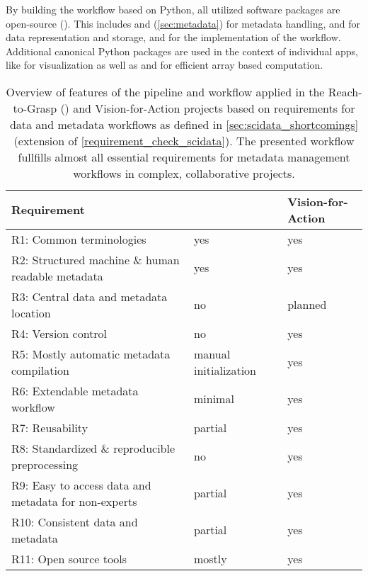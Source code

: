 By building the workflow based on Python, all utilized software packages are open-source (). This includes  and  (\cref{sec:metadata}) for metadata handling,  and  for data representation and storage, and  for the implementation of the workflow. Additional  canonical Python packages are used in the context of individual apps, like  for visualization as well as  and  for efficient array based computation.

\begin{table}[]
\footnotesize
\begin{tabular}{|l|l|l|}
\hline
Requirement                                          &  \cite{Brochier_2018} & Vision-for-Action \\  \hline
R1: Common terminologies                             &  yes & yes \\ \hline
R2: Structured machine \& human readable metadata    &  yes & yes \\ \hline
R3: Central data and metadata location               &  no & planned \\ \hline
R4: Version control                                  &  no & yes \\ \hline
R5: Mostly automatic metadata compilation            &  manual initialization & yes \\ \hline
R6: Extendable metadata workflow                     &  minimal & yes \\ \hline
R7: Reusability                                      &  partial & yes \\ \hline
R8: Standardized \& reproducible preprocessing       &  no & yes \\ \hline
R9: Easy to access data and metadata for non-experts &  partial & yes \\ \hline
R10: Consistent data and metadata                    &  partial & yes \\ \hline
R11: Open source tools                               &  mostly & yes \\ \hline
\end{tabular}
\caption[Overview of workflow features for Vision-for-Action project]{Overview of features of the pipeline and workflow applied in the Reach-to-Grasp (\cite{Brochier_2018}) and Vision-for-Action projects based on requirements for data and metadata workflows as defined in \cref{sec:scidata_shortcomings} (extension of \cref{requirement_check_scidata}). The presented workflow fullfills almost all essential requirements for metadata management workflows in complex, collaborative projects.}
\label{tab:requirement_check_v4a}
\end{table}



